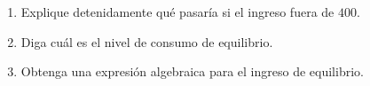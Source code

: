 \documentclass[11pt]{article}
\newenvironment{partes}
  {\begin{enumerate}[label=(\alph*), leftmargin=1.0cm]}
  {\end{enumerate}}
\begin{document}
\begin{partes}
    \item Explique detenidamente qu\'e pasar\'ia si el ingreso fuera de $400$.
    \item Diga cu\'al es el nivel de consumo de equilibrio.
    \item Obtenga una expresi\'on algebraica para el ingreso de equilibrio.
\end{partes}
\end{document}

